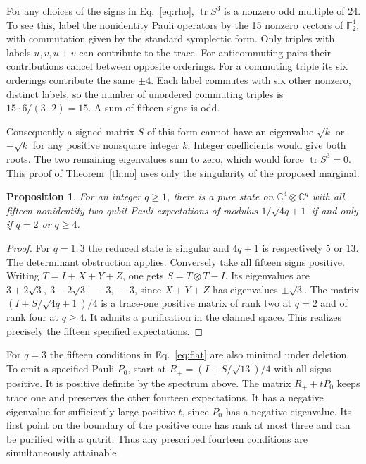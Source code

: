\documentclass[11pt]{article}
\newtheorem{proposition}[theorem]{Proposition}
\newcommand{\CC}{\mathbb C}\newcommand{\ZZ}{\mathbb Z}\newcommand{\RR}{\mathbb R}
\newcommand{\tr}{\operatorname{tr}}\newcommand{\rank}{\operatorname{rank}}
\begin{document}
For any choices of the signs in Eq.~\eqref{eq:rho}, $\tr S^3$ is a nonzero odd multiple of 24. To see this, label the nonidentity Pauli operators by the 15 nonzero vectors of $\mathbb F_2^4$, with commutation given by the standard symplectic form. Only triples with labels $u,v,u+v$ can contribute to the trace. For anticommuting pairs their contributions cancel between opposite orderings. For a commuting triple its six orderings contribute the same $\pm4$. Each label commutes with six other nonzero, distinct labels, so the number of unordered commuting triples is $15\cdot6/(3\cdot2)=15$. A sum of fifteen signs is odd.

Consequently a signed matrix $S$ of this form cannot have an eigenvalue $\sqrt{k}$ or $-\sqrt{k}$ for any positive nonsquare integer $k$. Integer coefficients would give both roots. The two remaining eigenvalues sum to zero, which would force $\tr S^3=0$. This proof of Theorem~\ref{th:no} uses only the singularity of the proposed marginal.

\begin{proposition}\label{prop:sharp}
For an integer $q\geq1$, there is a pure state on $\CC^4\otimes\CC^q$ with all fifteen nonidentity two-qubit Pauli expectations of modulus $1/\sqrt{4q+1}$ if and only if $q=2$ or $q\geq4$.
\end{proposition}
\begin{proof}
For $q=1,3$ the reduced state is singular and $4q+1$ is respectively 5 or 13. The determinant obstruction applies. Conversely take all fifteen signs positive. Writing $T=I+X+Y+Z$, one gets $S=T\otimes T-I$. Its eigenvalues are $3+2\sqrt3,\ 3-2\sqrt3,\ -3,\ -3$, since $X+Y+Z$ has eigenvalues $\pm\sqrt3$. The matrix $(I+S/\sqrt{4q+1})/4$ is a trace-one positive matrix of rank two at $q=2$ and of rank four at $q\geq4$. It admits a purification in the claimed space. This realizes precisely the fifteen specified expectations.
\end{proof}

For $q=3$ the fifteen conditions in Eq.~\eqref{eq:flat} are also minimal under deletion. To omit a specified Pauli $P_0$, start at $R_+=(I+S/\sqrt{13})/4$ with all signs positive. It is positive definite by the spectrum above. The matrix $R_++tP_0$ keeps trace one and preserves the other fourteen expectations. It has a negative eigenvalue for sufficiently large positive $t$, since $P_0$ has a negative eigenvalue. Its first point on the boundary of the positive cone has rank at most three and can be purified with a qutrit. Thus any prescribed fourteen conditions are simultaneously attainable.
\end{document}
